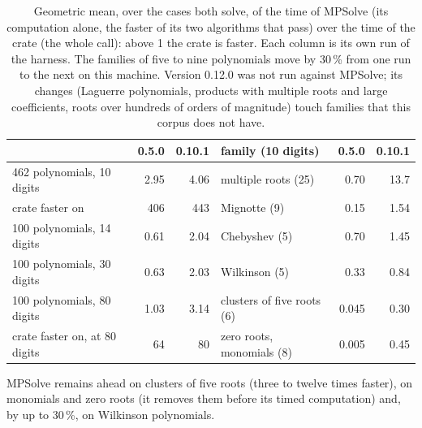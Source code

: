 \documentclass[10pt,a4paper]{article}
\theoremstyle{definition}
\numberwithin{equation}{section}
\begin{document}
\begin{table}[H]\centering\small
\begin{tabular}{lrr@{\qquad}lrr}
\toprule
 & 0.5.0 & 0.10.1 & family (10 digits) & 0.5.0 & 0.10.1\\
\midrule
462 polynomials, 10 digits & 2.95 & 4.06 & multiple roots (25) & 0.70 & 13.7\\
\quad crate faster on & 406 & 443 & Mignotte (9) & 0.15 & 1.54\\
100 polynomials, 14 digits & 0.61 & 2.04 & Chebyshev (5) & 0.70 & 1.45\\
100 polynomials, 30 digits & 0.63 & 2.03 & Wilkinson (5) & 0.33 & 0.84\\
100 polynomials, 80 digits & 1.03 & 3.14 & clusters of five roots (6) & 0.045 & 0.30\\
\quad crate faster on, at 80 digits & 64 & 80 & zero roots, monomials (8) & 0.005 & 0.45\\
\bottomrule
\end{tabular}
\caption{Geometric mean, over the cases both solve, of the time of MPSolve (its computation alone, the
faster of its two algorithms that pass) over the time of the crate (the whole call): above 1 the crate is
faster. Each column is its own run of the harness. The families of five to nine polynomials move by 30\,\%
from one run to the next on this machine. Version 0.12.0 was not run against MPSolve; its changes
(Laguerre polynomials, products with multiple roots and large coefficients, roots over hundreds of orders
of magnitude) touch families that this corpus does not have.}\label{tab:mpsolvetime}
\end{table}
MPSolve remains ahead on clusters of five roots (three to twelve times faster), on monomials and zero
roots (it removes them before its timed computation) and, by up to 30\,\%, on Wilkinson polynomials.
\end{document}
